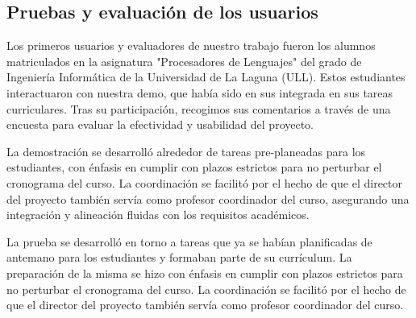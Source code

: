 \subsection{Pruebas y evaluación de los usuarios}
Los primeros usuarios y evaluadores de nuestro trabajo fueron los alumnos matriculados en la asignatura "Procesadores de Lenguajes" del grado de Ingeniería Informática de la Universidad de La Laguna (\acrshort{ULL}). Estos estudiantes interactuaron con nuestra demo, que había sido en sus integrada en sus tareas curriculares. Tras su participación, recogimos sus comentarios a través de una encuesta para evaluar la efectividad y usabilidad del proyecto.

La demostración se desarrolló alrededor de tareas pre-planeadas para los estudiantes, con énfasis en cumplir con plazos estrictos para no perturbar el cronograma del curso. La coordinación se facilitó por el hecho de que el director del proyecto también servía como profesor coordinador del curso, asegurando una integración y alineación fluidas con los requisitos académicos.

La prueba se desarrolló en torno a tareas que ya se habían planificadas de antemano para los estudiantes y formaban parte de su currículum. La preparación de la misma se hizo con énfasis en cumplir con plazos estrictos para no perturbar el cronograma del curso. La coordinación se facilitó por el hecho de que el director del proyecto también servía como profesor coordinador del curso.

